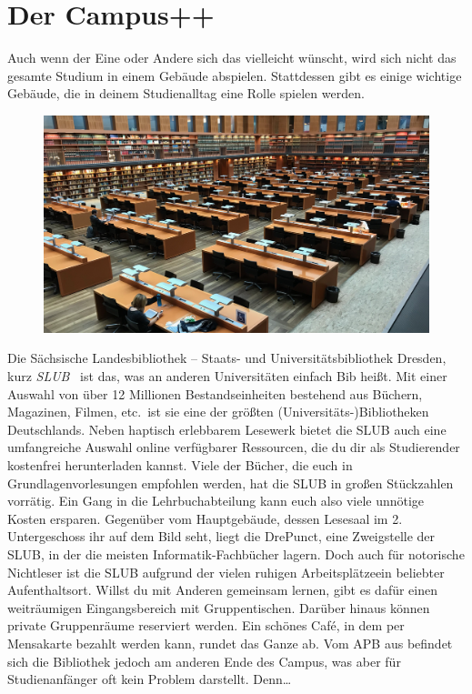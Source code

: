 \chapter*{Der Campus++}

Auch wenn der Eine oder Andere sich das vielleicht wünscht, wird sich nicht das gesamte Studium in einem Gebäude abspielen.
Stattdessen gibt es einige wichtige Gebäude, die in deinem Studienalltag eine Rolle spielen werden.

\begin{figure}[b!]
    \centering
    \includegraphics[width=\linewidth]{img/slub-lesesaal}
\end{figure}

Die Sächsische Landesbibliothek – Staats- und Universitätsbibliothek Dresden, kurz \emph{SLUB}~ ist das, was an anderen Universitäten einfach Bib heißt.
Mit einer Auswahl von über 12 Millionen Bestandseinheiten bestehend aus Büchern, Magazinen, Filmen, etc.\ ist sie eine der größten (Universitäts-)Bibliotheken Deutschlands.
Neben haptisch erlebbarem Lesewerk bietet die SLUB auch eine umfangreiche Auswahl online verfügbarer Ressourcen, die du dir als Studierender kostenfrei herunterladen kannst.
Viele der Bücher, die euch in Grundlagenvorlesungen empfohlen werden, hat die SLUB in großen Stückzahlen vorrätig. Ein Gang in die Lehrbuchabteilung kann euch also viele unnötige Kosten ersparen.
Gegenüber vom Hauptgebäude, dessen Lesesaal im 2. Untergeschoss ihr auf dem Bild seht, liegt die DrePunct, eine Zweigstelle der SLUB, in der die meisten Informatik-Fachbücher lagern.
Doch auch für notorische Nichtleser ist die SLUB aufgrund der vielen ruhigen Arbeitsplätzeein beliebter Aufenthaltsort.
Willst du mit Anderen gemeinsam lernen, gibt es dafür einen weiträumigen Eingangsbereich mit Gruppentischen.
Darüber hinaus können private Gruppenräume reserviert werden. Ein schönes Café, in dem per Mensakarte bezahlt werden kann, rundet das Ganze ab.
Vom APB aus befindet sich die Bibliothek jedoch am anderen Ende des Campus, was aber für Studienanfänger oft kein Problem darstellt. Denn\dots

